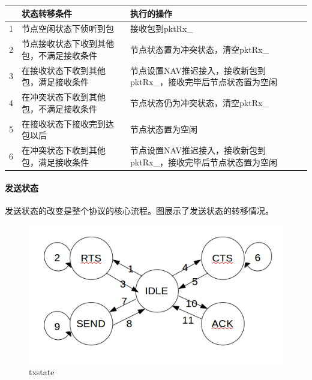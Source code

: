 \begin{table}[!ht]
	\centering
\begin{tabular}{c p{7cm} p{8cm}}
	\hline  %
	 &状态转移条件&执行的操作\\
	\hline  %
	1&节点空闲状态下侦听到包 & 接收包到pktRx\_\\
	2&节点接收状态下收到其他包，不满足接收条件&节点状态置为冲突状态，清空pktRx\_\\
	3&在接收状态下收到其他包，满足接收条件&节点设置NAV推迟接入，接收新包到pktRx\_，接收完毕后节点状态置为空闲\\
	4&在冲突状态下收到其他包，不满足接收条件&节点状态仍为冲突状态，清空pktRx\_\\
	5&在接收状态下接收完到达包以后&节点状态置为空闲\\	
	6&在冲突状态下收到其他包，满足接收条件&节点设置NAV推迟接入，接收新包到pktRx\_，接收完毕后节点状态置为空闲\\
	\hline
\end{tabular}
\end{table}

\paragraph{发送状态} 发送状态的改变是整个协议的核心流程。图展示了发送状态的转移情况。
 \begin{figure}[!ht]
 	\centering
 	\includegraphics[scale=0.5]{figures/txstate.png}
 	\caption{
 		txstate
 	}
 	\label{fig:example}
 \end{figure}
 
